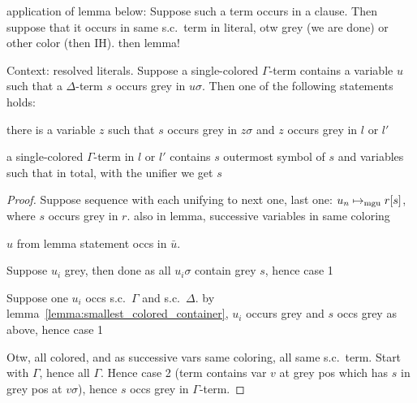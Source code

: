 \documentclass[,%
	draft=false,%
	numbers=noendperiod
	11pt,
	a4paper,
	oneside,%
	openany,
]{memoir}
\begin{document}
application of lemma below:
Suppose such a term occurs in a clause. Then suppose that it occurs in same s.c.\ term in literal, otw grey (we are done) or other color (then IH). then lemma!

\begin{lemma}
	\label{lemma:u_sigma_contains_delta_term}
	Context: resolved literals.
	Suppose a single-colored $\Gamma$-term contains a variable $u$ such that a $\Delta$-term $s$ occurs grey in $u\sigma$.
	Then one of the following statements holds:
	\begin{compactenum}
	\item there is a variable $z$ such that $s$ occurs grey in $z\sigma$ and $z$ occurs grey in $l$ or $l'$ 
	\item a single-colored $\Gamma$-term in $l$ or $l'$ contains $s$ outermost symbol of $s$ and variables such that in total, with the unifier we get $s$
	\end{compactenum}
\end{lemma}
\begin{proof}
	Suppose sequence with each unifying to next one, last one: $u_n \mapsto_{\operatorname{mgu}} r[s]$, where $s$ occurs grey in $r$.
	also in lemma, successive variables in same coloring

	$u$ from lemma statement occs in $\bar u$. 	

	Suppose $u_i$ grey, then done as all $u_i\sigma$ contain grey $s$, hence case 1

	Suppose one $u_i$ occs s.c.\ $\Gamma$ and  s.c.\ $\Delta$. by lemma~\ref{lemma:smallest_colored_container}, $u_i$ occurs grey and $s$ occs grey as above, hence case 1

	Otw, all colored, and as successive vars same coloring, all same s.c.\ term.
	Start with $\Gamma$, hence all $\Gamma$. 
	Hence case 2 (term contains var $v$ at grey pos which has $s$ in grey pos at $v\sigma$), hence $s$ occs grey in $\Gamma$-term.



\end{proof}
\end{document}
